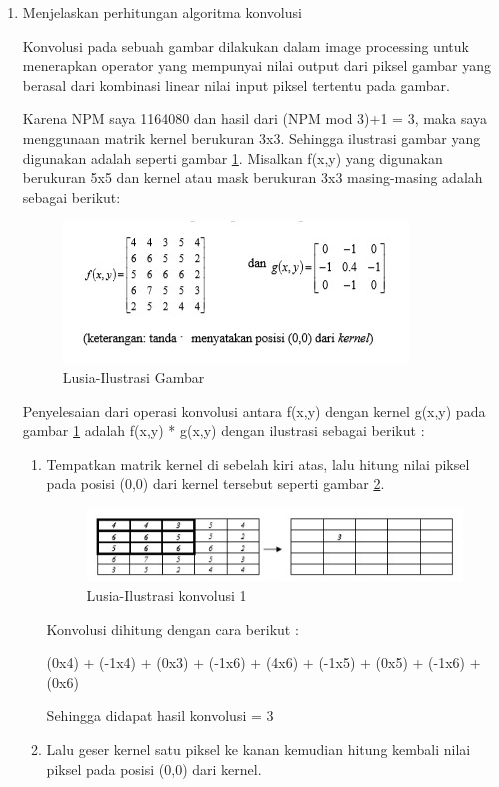 \begin{enumerate}
\item Menjelaskan perhitungan algoritma konvolusi
	\par Konvolusi pada sebuah gambar dilakukan dalam image processing untuk menerapkan operator yang mempunyai nilai output dari piksel gambar yang berasal dari kombinasi linear nilai input piksel tertentu pada gambar. 
	\par Karena NPM saya 1164080 dan hasil dari (NPM mod 3)+1 = 3, maka saya menggunaan matrik kernel berukuran 3x3. Sehingga ilustrasi gambar yang digunakan adalah seperti gambar \ref{7A13}. Misalkan  f(x,y) yang digunakan berukuran 5x5 dan kernel atau mask berukuran 3x3 masing-masing adalah sebagai berikut: 
		\begin{figure}[!hbtp]
		\centering
		\includegraphics[scale=0.4]{figures/v13.jpg}
		\caption{Lusia-Ilustrasi Gambar}
		\label{7A13}
		\end{figure}
	\par Penyelesaian dari operasi konvolusi antara  f(x,y) dengan kernel g(x,y) pada gambar \ref{7A13} adalah  f(x,y) * g(x,y) dengan ilustrasi sebagai berikut :
	\begin{enumerate}
	\item Tempatkan matrik kernel di sebelah kiri atas, lalu hitung nilai piksel pada posisi (0,0) dari kernel tersebut seperti gambar \ref{7A13a}.
		\begin{figure}[!hbtp]
		\centering
		\includegraphics[scale=0.4]{figures/v13a.jpg}
		\caption{Lusia-Ilustrasi konvolusi 1}
		\label{7A13a}
		\end{figure}
		\par Konvolusi dihitung dengan cara berikut :
		\par (0x4) + (-1x4) + (0x3) + (-1x6) + (4x6) + (-1x5) + (0x5) + (-1x6) + (0x6)
		\par Sehingga didapat hasil konvolusi = 3
	\item Lalu geser kernel satu piksel ke kanan kemudian hitung kembali  nilai piksel pada posisi (0,0) dari kernel.

\end{enumerate}
\end{enumerate}
